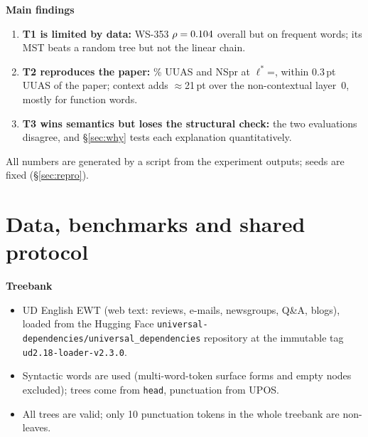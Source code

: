 \documentclass[11pt,a4paper]{article}
\newcommand{\lstar}{\ensuremath{\ell^*}}
\newcommand{\pt}{\,pt}
\newcommand{\blk}[1]{\par\needspace{5\baselineskip}\smallskip\noindent\textbf{#1}\par\nobreak\vspace{1pt}}
\begin{document}
\blk{Main findings}
\begin{enumerate}
\item \textbf{T1 is limited by data:} WS-353 $\rho=0.104$ overall but \TOneWSFreqTwenty{} on frequent words; its MST beats a
random tree but not the linear chain.
\item \textbf{T2 reproduces the paper:} \TtwoTestUuas\% UUAS and NSpr \TtwoTestNspr{} at \lstar=\Lstar, within 0.3\pt{} UUAS of the
paper; context adds $\approx$21\pt{} over the non-contextual layer~0, mostly for function words.
\item \textbf{T3 wins semantics but loses the structural check:} the two evaluations disagree, and \S\ref{sec:why} tests each
explanation quantitatively.
\end{enumerate}
All numbers are generated by a script from the experiment outputs; seeds are fixed (\S\ref{sec:repro}).

\section{Data, benchmarks and shared protocol}\label{sec:data}
\blk{Treebank}
\begin{itemize}
\item UD English EWT (web text: reviews, e-mails, newsgroups, Q\&A, blogs), loaded from the Hugging Face
\texttt{universal-dependencies/universal\_dependencies} repository at the immutable tag \texttt{ud2.18-loader-v2.3.0}.
\item Syntactic words are used (multi-word-token surface forms and empty nodes excluded); trees come from \texttt{head}, punctuation from UPOS.
\item All trees are valid; only 10 punctuation tokens in the whole treebank are non-leaves.
\end{itemize}
\begin{table}[h]\centering\small
\caption{UD English EWT splits. Train has \VocabTypes{} lowercased word types, \VocabSingletonPct\% of them singletons;
\TestOOV\% of test tokens are unseen in train.}\label{tab:data}\end{table}
\end{document}
